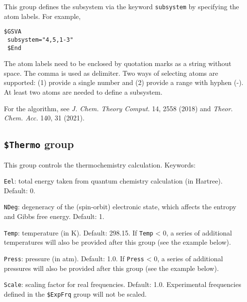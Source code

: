 \documentclass[12pt,english]{extarticle}
\begin{document}
This group defines the subsystem via the keyword \verb|subsystem| by specifying the atom labels.
For example,
\begin{Verbatim}[frame=single]
 $GSVA
 subsystem="4,5,1-3"
 $End
\end{Verbatim}

The atom labels need to be enclosed by quotation marks as a string without space. The comma is used as delimiter. Two ways of selecting atoms are supported: (1) provide a single number and (2) provide a range with hyphen (-). At least two atoms are needed to define a subsystem.

For the algorithm, see \textit{J. Chem. Theory Comput.} 14, 2558 (2018) and \textit{Theor. Chem. Acc.} 140, 31 (2021).


\subsection{\texttt{\$Thermo} group} \label{sec:inp-thermo}

This group controls the thermochemistry calculation. Keywords:

\bigskip{}
\verb|Eel|: total energy taken from quantum chemistry calculation (in Hartree). Default: 0.

\bigskip{}
\verb|NDeg|: degeneracy of the (spin-orbit) electronic state, which affects the entropy and Gibbs free energy. Default: 1.

\bigskip{}
\verb|Temp|: temperature (in K). Default: 298.15. If \verb|Temp| < 0, a series of additional temperatures will also be provided after this group (see the example below).

\bigskip{}
\verb|Press|: pressure (in atm). Default: 1.0. If \verb|Press| < 0, a series of additional pressures will also be provided after this group (see the example below).

\bigskip{}
\verb|Scale|: scaling factor for real frequencies. Default: 1.0. Experimental frequencies defined in the \texttt{\$ExpFrq} group will not be scaled.
\end{document}
